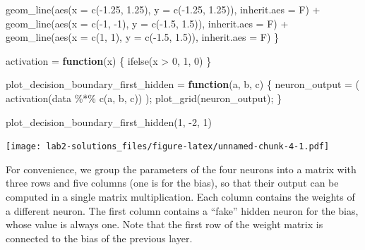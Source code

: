\documentclass[
]{article}
\newenvironment{Shaded}{\begin{snugshade}}{\end{snugshade}}
\newcommand{\AttributeTok}[1]{\textcolor[rgb]{0.77,0.63,0.00}{#1}}
\newcommand{\ControlFlowTok}[1]{\textcolor[rgb]{0.13,0.29,0.53}{\textbf{#1}}}
\newcommand{\DecValTok}[1]{\textcolor[rgb]{0.00,0.00,0.81}{#1}}
\newcommand{\FloatTok}[1]{\textcolor[rgb]{0.00,0.00,0.81}{#1}}
\newcommand{\FunctionTok}[1]{\textcolor[rgb]{0.00,0.00,0.00}{#1}}
\newcommand{\NormalTok}[1]{#1}
\newcommand{\OtherTok}[1]{\textcolor[rgb]{0.56,0.35,0.01}{#1}}
\newcommand{\SpecialCharTok}[1]{\textcolor[rgb]{0.00,0.00,0.00}{#1}}
\begin{document}
\begin{Shaded}
\begin{Highlighting}[]
    \FunctionTok{geom\_line}\NormalTok{(}\FunctionTok{aes}\NormalTok{(}\AttributeTok{x =} \FunctionTok{c}\NormalTok{(}\SpecialCharTok{{-}}\FloatTok{1.25}\NormalTok{, }\FloatTok{1.25}\NormalTok{), }\AttributeTok{y =} \FunctionTok{c}\NormalTok{(}\SpecialCharTok{{-}}\FloatTok{1.25}\NormalTok{, }\FloatTok{1.25}\NormalTok{)), }\AttributeTok{inherit.aes =}\NormalTok{ F) }\SpecialCharTok{+}
    \FunctionTok{geom\_line}\NormalTok{(}\FunctionTok{aes}\NormalTok{(}\AttributeTok{x =} \FunctionTok{c}\NormalTok{(}\SpecialCharTok{{-}}\DecValTok{1}\NormalTok{, }\SpecialCharTok{{-}}\DecValTok{1}\NormalTok{), }\AttributeTok{y =} \FunctionTok{c}\NormalTok{(}\SpecialCharTok{{-}}\FloatTok{1.5}\NormalTok{, }\FloatTok{1.5}\NormalTok{)), }\AttributeTok{inherit.aes =}\NormalTok{ F) }\SpecialCharTok{+}
    \FunctionTok{geom\_line}\NormalTok{(}\FunctionTok{aes}\NormalTok{(}\AttributeTok{x =} \FunctionTok{c}\NormalTok{(}\DecValTok{1}\NormalTok{, }\DecValTok{1}\NormalTok{), }\AttributeTok{y =} \FunctionTok{c}\NormalTok{(}\SpecialCharTok{{-}}\FloatTok{1.5}\NormalTok{, }\FloatTok{1.5}\NormalTok{)), }\AttributeTok{inherit.aes =}\NormalTok{ F)}
\NormalTok{\}}

\NormalTok{activation }\OtherTok{=} \ControlFlowTok{function}\NormalTok{(x) \{}
  \FunctionTok{ifelse}\NormalTok{(x }\SpecialCharTok{\textgreater{}} \DecValTok{0}\NormalTok{, }\DecValTok{1}\NormalTok{, }\DecValTok{0}\NormalTok{)}
\NormalTok{\}}

\NormalTok{plot\_decision\_boundary\_first\_hidden }\OtherTok{=} \ControlFlowTok{function}\NormalTok{(a, b, c) \{}
\NormalTok{  neuron\_output }\OtherTok{=}\NormalTok{ (}
    \FunctionTok{activation}\NormalTok{(data }\SpecialCharTok{\%*\%} \FunctionTok{c}\NormalTok{(a, b, c))}
\NormalTok{  );}
  \FunctionTok{plot\_grid}\NormalTok{(neuron\_output);}
\NormalTok{\}}

\FunctionTok{plot\_decision\_boundary\_first\_hidden}\NormalTok{(}\DecValTok{1}\NormalTok{, }\SpecialCharTok{{-}}\DecValTok{2}\NormalTok{, }\DecValTok{1}\NormalTok{)}
\end{Highlighting}
\end{Shaded}

\texttt{[image: lab2-solutions\_files/figure-latex/unnamed-chunk-4-1.pdf]}

For convenience, we group the parameters of the four neurons into a
matrix with three rows and five columns (one is for the bias), so that
their output can be computed in a single matrix multiplication. Each
column contains the weights of a different neuron. The first column
contains a ``fake'' hidden neuron for the bias, whose value is always
one. Note that the first row of the weight matrix is connected to the
bias of the previous layer.
\end{document}
